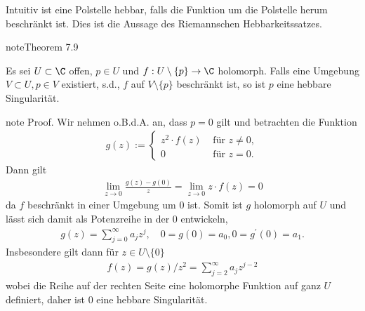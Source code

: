 \documentclass[letterpaper,10pt,german]{jupyterBook}
\begin{document}
\sphinxAtStartPar
Intuitiv ist eine Polstelle hebbar, falls die Funktion um die Polstelle herum beschränkt ist. Dies ist die Aussage des Riemannschen Hebbarkeitssatzes.
\label{complexanalysis/residuensatz:thm:hebbar}
\begin{sphinxadmonition}{note}{Theorem 7.9}



\sphinxAtStartPar
Es sei \(U\subset \C\) offen, \(p\in U\) und \(f:U\setminus\{p\}\to\C\) holomorph. Falls eine Umgebung \(V\subset U, p\in V\) existiert, s.d., \(f\) auf \(V\setminus\{p\}\) beschränkt ist, so ist \(p\) eine hebbare Singularität.
\end{sphinxadmonition}

\begin{sphinxadmonition}{note}
\sphinxAtStartPar
Proof. Wir nehmen o.B.d.A. an, dass \(p=0\) gilt und betrachten die Funktion
\begin{equation*}
\begin{split}g(z) :=
\begin{cases}
z^2\cdot f(z)&\text{ für } z\neq 0,\\
0&\text{ für } z=0.
\end{cases}\end{split}
\end{equation*}
\sphinxAtStartPar
Dann gilt
\begin{equation*}
\begin{split}\lim_{z\to 0} \frac{g(z) - g(0)}{z} = \lim_{z\to 0} z\cdot f(z) =0\end{split}
\end{equation*}
\sphinxAtStartPar
da \(f\) beschränkt in einer Umgebung um \(0\) ist. Somit ist \(g\) holomorph auf \(U\) und lässt sich damit als Potenzreihe in der \(0\) entwickeln,
\begin{equation*}
\begin{split}g(z) = \sum_{j=0}^\infty a_j z^j,\quad 0 = g(0) = a_0, 0=g^\prime(0)=a_1.\end{split}
\end{equation*}
\sphinxAtStartPar
Insbesondere gilt dann für \(z\in U\setminus\{0\}\)
\begin{equation*}
\begin{split}f(z) = g(z)/z^2 = \sum_{j=2}^\infty a_j z^{j-2}\end{split}
\end{equation*}
\sphinxAtStartPar
wobei die Reihe auf der rechten Seite eine holomorphe Funktion auf ganz \(U\) definiert, daher ist \(0\) eine hebbare Singularität.
\end{sphinxadmonition}
\end{document}
